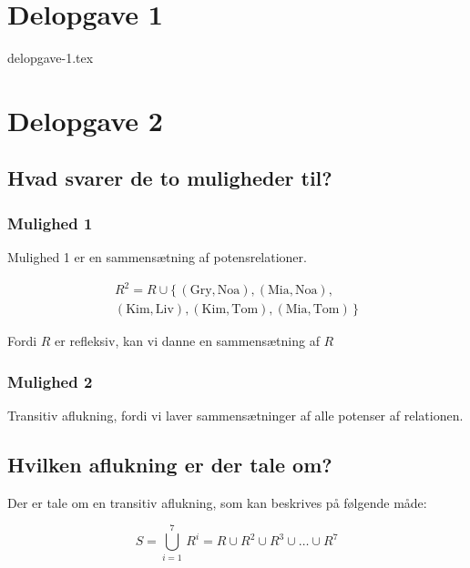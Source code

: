 \section{Delopgave 1}\label{sec:delopgave-1}

{delopgave-1.tex}


\section{Delopgave 2}\label{sec:delopgave-2}

\subsection{Hvad svarer de to muligheder til?}\label{subsec:hvad-svarer-de-to-muligheder-til?}

\subsubsection*{Mulighed 1}
Mulighed 1 er en sammensætning af potensrelationer.

\begin{equation}
    \begin{split}
        R^2 = R \cup \{\,(\text{Gry}, \text{Noa}), (\text{Mia}, \text{Noa}), \\
        (\text{Kim}, \text{Liv}), (\text{Kim}, \text{Tom}), (\text{Mia}, \text{Tom})\,\}
    \end{split}\label{eq:equation7}
\end{equation}

Fordi \(R\) er refleksiv, kan vi danne en sammensætning af \(R\)

\subsubsection*{Mulighed 2}
Transitiv aflukning, fordi vi laver sammensætninger af alle potenser af relationen.

\subsection{Hvilken aflukning er der tale om?}\label{subsec:hvilken-aflukning-er-der-tale-om?}
Der er tale om en transitiv aflukning, som kan beskrives på følgende måde:

\begin{equation}
    S = \bigcup_{i=1}^{7} \, R^{i} = R \cup R^2 \cup R^3 \cup \ldots \cup R^7 \label{eq:equation6}
\end{equation}


